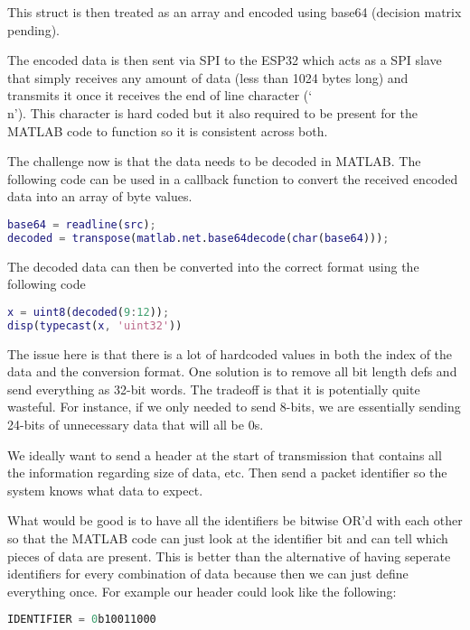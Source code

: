 This struct is then treated as an array and encoded using base64
(decision matrix pending).

The encoded data is then sent via SPI to the ESP32 which acts
as a SPI slave that simply receives any amount of data
(less than 1024 bytes long) and transmits it once it receives
the end of line character (`\\n').
This character is hard coded but it also required to be present
for the MATLAB code to function so it is consistent across both.

The challenge now is that the data needs to be decoded in MATLAB.
The following code can be used in a callback function to convert
the received encoded data into an array of byte values.

\begin{lstlisting}[language=MATLAB]
base64 = readline(src);
decoded = transpose(matlab.net.base64decode(char(base64)));
\end{lstlisting}

The decoded data can then be converted into the correct format
using the following code

\begin{lstlisting}[language=MATLAB]
x = uint8(decoded(9:12));
disp(typecast(x, 'uint32'))
\end{lstlisting}

The issue here is that there is a lot of hardcoded values
in both the index of the data and the conversion format.
One solution is to remove all bit length defs and send everything
as 32-bit words. The tradeoff is that it is potentially quite wasteful.
For instance, if we only needed to send 8-bits, we are essentially
sending 24-bits of unnecessary data that will all be 0s.

We ideally want to send a header at the start of transmission that
contains all the information regarding size of data, etc.
Then send a packet identifier so the system knows what data to expect.

What would be good is to have all the identifiers be bitwise OR'd
with each other so that the MATLAB code can just look at the identifier
bit and can tell which pieces of data are present.
This is better than the alternative of having seperate identifiers for
every combination of data because then we can just define everything once.
For example our header could look like the following:

\begin{lstlisting}[language=C]
IDENTIFIER = 0b10011000
\end{lstlisting}

